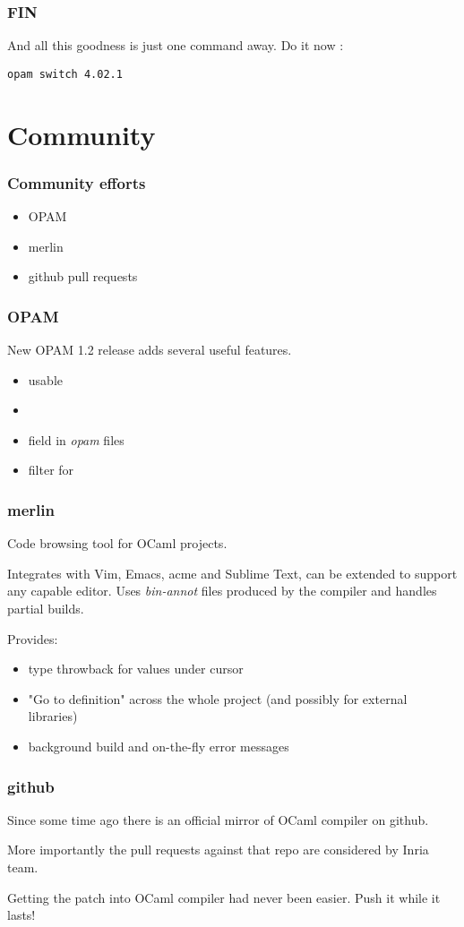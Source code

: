 \begin{frame}
\frametitle{FIN}
And all this goodness is just one command away. Do it now :
\begin{verbatim}
opam switch 4.02.1
\end{verbatim}
\end{frame}

\section{Community}

\begin{frame}
\frametitle{Community efforts}
\begin{itemize}
\item OPAM
\item merlin
\item github pull requests
\end{itemize}
\end{frame}

\begin{frame}
\frametitle{OPAM}
New OPAM 1.2 release adds several useful features.
\begin{itemize}
\item usable 
\item {}
\item {} field in \emph{opam} files
\item {} filter for 
\end{itemize}
\end{frame}

\begin{frame}
\frametitle{merlin}
Code browsing tool for OCaml projects.

Integrates with Vim, Emacs, acme and Sublime Text, can be extended to support any capable editor.
Uses \emph{bin-annot} files produced by the compiler and handles partial builds.

Provides:
\begin{itemize}
\item type throwback for values under cursor
\item "Go to definition" across the whole project (and possibly for external libraries)
\item background build and on-the-fly error messages
\end{itemize}
\end{frame}

\begin{frame}
\frametitle{github}
Since some time ago there is an official mirror of OCaml compiler on github.

More importantly the pull requests against that repo are considered by Inria team.

Getting the patch into OCaml compiler had never been easier. Push it while it lasts!
\end{frame}

